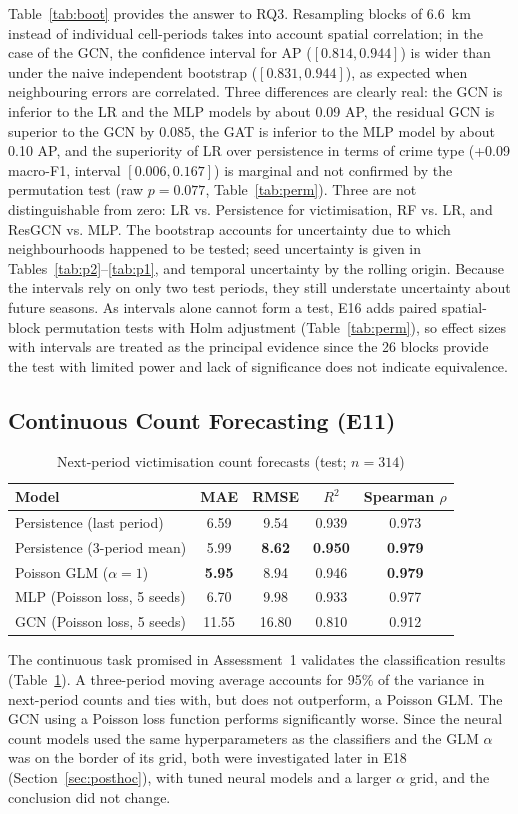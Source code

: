 \documentclass[11pt,a4paper]{report}
\begin{document}
Table~\ref{tab:boot} provides the answer to RQ3. Resampling blocks of 6.6~km instead of individual cell-periods takes into account spatial correlation; in the case of the GCN, the confidence interval for AP ($[0.814, 0.944]$) is wider than under the naive independent bootstrap ($[0.831, 0.944]$), as expected when neighbouring errors are correlated. Three differences are clearly real: the GCN is inferior to the LR and the MLP models by about 0.09 AP, the residual GCN is superior to the GCN by 0.085, the GAT is inferior to the MLP model by about 0.10 AP, and the superiority of LR over persistence in terms of crime type (+0.09 macro-F1, interval $[0.006, 0.167]$) is marginal and not confirmed by the permutation test (raw $p=0.077$, Table~\ref{tab:perm}). Three are not distinguishable from zero: LR vs. Persistence for victimisation, RF vs. LR, and ResGCN vs. MLP. The bootstrap accounts for uncertainty due to which neighbourhoods happened to be tested; seed uncertainty is given in Tables~\ref{tab:p2}--\ref{tab:p1}, and temporal uncertainty by the rolling origin. Because the intervals rely on only two test periods, they still understate uncertainty about future seasons. As intervals alone cannot form a test, E16 adds paired spatial-block permutation tests with Holm adjustment (Table~\ref{tab:perm}), so effect sizes with intervals are treated as the principal evidence since the 26 blocks provide the test with limited power and lack of significance does not indicate equivalence.

\subsection{Continuous Count Forecasting (E11)}
\begin{table}[H]
\centering\small
\caption{Next-period victimisation count forecasts (test; $n=314$)}
\label{tab:reg}
\begin{tabular}{@{}lcccc@{}}
\toprule
Model & MAE & RMSE & $R^2$ & Spearman $\rho$\\
\midrule
Persistence (last period) & 6.59 & 9.54 & 0.939 & 0.973\\
Persistence (3-period mean) & 5.99 & \textbf{8.62} & \textbf{0.950} & \textbf{0.979}\\
Poisson GLM ($\alpha=1$) & \textbf{5.95} & 8.94 & 0.946 & \textbf{0.979}\\
MLP (Poisson loss, 5 seeds) & 6.70 & 9.98 & 0.933 & 0.977\\
GCN (Poisson loss, 5 seeds) & 11.55 & 16.80 & 0.810 & 0.912\\
\bottomrule
\end{tabular}
\end{table}
The continuous task promised in Assessment~1 validates the classification results (Table~\ref{tab:reg}). A three-period moving average accounts for 95\% of the variance in next-period counts and ties with, but does not outperform, a Poisson GLM. The GCN using a Poisson loss function performs significantly worse. Since the neural count models used the same hyperparameters as the classifiers and the GLM $\alpha$ was on the border of its grid, both were investigated later in E18 (Section~\ref{sec:posthoc}), with tuned neural models and a larger $\alpha$ grid, and the conclusion did not change.
\end{document}
